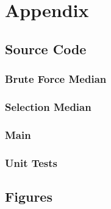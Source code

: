 \documentclass{article}
\begin{document}
\section{Appendix}
    \subsection{Source Code}
        \subsubsection{Brute Force Median}
            

        \subsubsection{Selection Median}
            

        \subsubsection{Main}
            

        \subsubsection{Unit Tests}
            
        \newpage


    \subsection{Figures}
\end{document}
